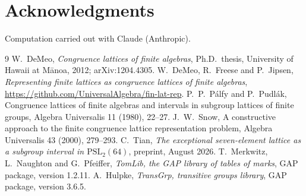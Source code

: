 \documentclass[11pt]{article}
\theoremstyle{remark}
\begin{document}
\section*{Acknowledgments}

Computation carried out with Claude (Anthropic).

\begin{thebibliography}{9}
 W.~DeMeo, \emph{Congruence lattices of finite algebras}, Ph.D.\ thesis,
University of Hawaii at M\=anoa, 2012; arXiv:1204.4305.
 W.~DeMeo, R.~Freese and P.~Jipsen, \emph{Representing finite lattices as congruence
lattices of finite algebras}, \url{https://github.com/UniversalAlgebra/fin-lat-rep}.
 P.~P.\ P\'alfy and P.~Pudl\'ak, Congruence lattices of finite algebras and intervals
in subgroup lattices of finite groups, Algebra Universalis 11 (1980), 22--27.
 J.~W.\ Snow, A constructive approach to the finite congruence lattice
representation problem, Algebra Universalis 43 (2000), 279--293.
 C.~Tian, \emph{The exceptional seven-element lattice as a subgroup interval in
$\mathrm{PSL}_2(64)$}, preprint, August 2026.
 T.~Merkwitz, L.~Naughton and G.~Pfeiffer, \emph{TomLib, the GAP library of tables of marks},
GAP package, version 1.2.11.
 A.~Hulpke, \emph{TransGrp, transitive groups library}, GAP package, version 3.6.5.
\end{thebibliography}
\end{document}
